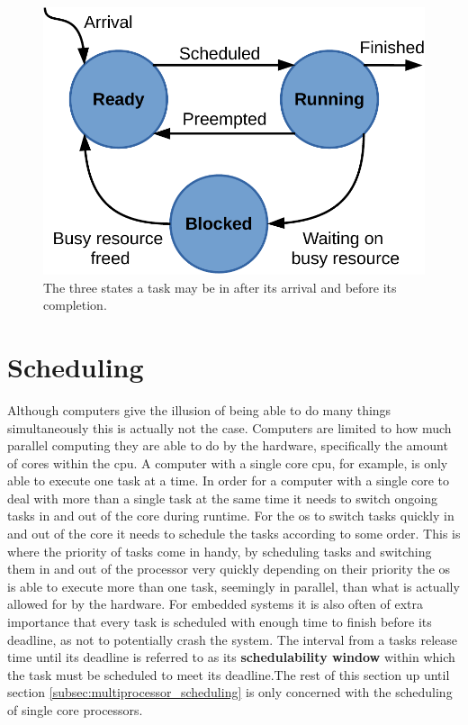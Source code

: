 \documentclass{kththesis}
\begin{document}
\begin{figure}

    \centering

    \includegraphics[width=0.7\linewidth]{images/ready-running-blocked-model.pdf}

    \caption{The three states a task may be in after its arrival and before its completion.}

    \label{fig:ready_running_blocked_model}

\end{figure}



\section{Scheduling} \label{sec:scheduling}

Although computers give the illusion of being able to do many things simultaneously this
is actually not the case. Computers are limited to how much parallel computing they are able to do
by the hardware, specifically the amount of cores within the \acrshort{cpu}. A computer with a
single core \acrshort{cpu}, for example, is only able to execute one task at a time. In order for a
computer with a single core to deal with more than a single task at the same time it needs to switch
ongoing tasks in and out of the core during runtime. For the \acrshort{os} to switch tasks quickly
in and out of the core it needs to schedule the tasks according to some order. This is where the
priority of tasks come in handy, by scheduling tasks and switching them in and out of the processor
very quickly depending on their priority the \acrshort{os} is able to execute more than one task,
seemingly in parallel, than what is actually allowed for by the hardware. For embedded systems it is
also often of extra importance that every task is scheduled with enough time to finish before its
deadline, as not to potentially crash the system. The interval from a tasks release time until its
deadline is referred to as its \textbf{schedulability window} within which the task must be
scheduled to meet its deadline.The rest of this section up until section
\ref{subsec:multiprocessor_scheduling} is only concerned with the scheduling of single core
processors.
\end{document}
